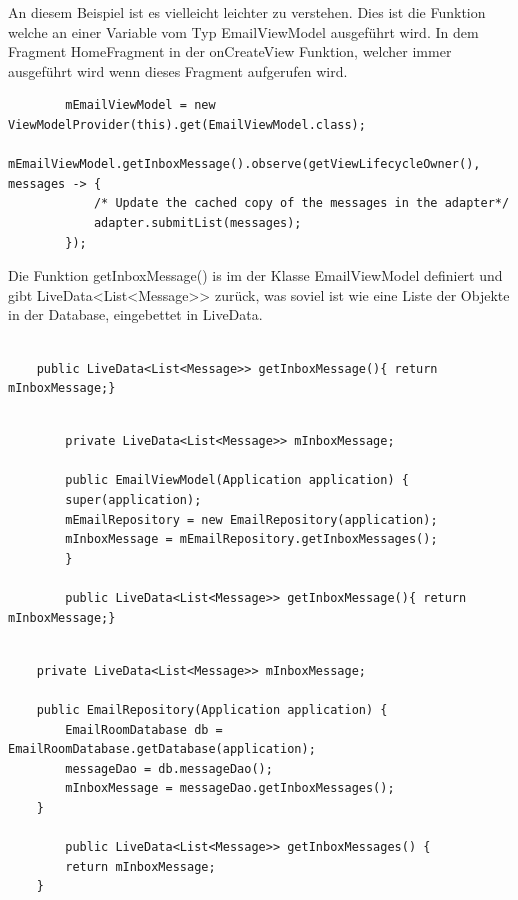 \documentclass[a4paper,11pt]{article}
\begin{document}
An diesem Beispiel ist es vielleicht leichter zu verstehen. Dies ist die Funktion welche an einer Variable vom Typ EmailViewModel ausgeführt wird. In dem Fragment HomeFragment in der
onCreateView Funktion, welcher immer ausgeführt wird wenn dieses Fragment aufgerufen wird. 


\lstset{language=java}
\begin{lstlisting}
        mEmailViewModel = new ViewModelProvider(this).get(EmailViewModel.class);
        mEmailViewModel.getInboxMessage().observe(getViewLifecycleOwner(), messages -> {
            /* Update the cached copy of the messages in the adapter*/
            adapter.submitList(messages);
        });
\end{lstlisting}

Die Funktion getInboxMessage() is im der Klasse EmailViewModel definiert und gibt LiveData<List<Message>> zurück, was soviel ist wie eine Liste der Objekte in der Database, eingebettet 
in LiveData.

\lstset{language=java}
\begin{lstlisting}

    public LiveData<List<Message>> getInboxMessage(){ return mInboxMessage;}

\end{lstlisting}

\lstset{language=java}
\begin{lstlisting}

        private LiveData<List<Message>> mInboxMessage;

        public EmailViewModel(Application application) {
        super(application);
        mEmailRepository = new EmailRepository(application);
        mInboxMessage = mEmailRepository.getInboxMessages();
        }

        public LiveData<List<Message>> getInboxMessage(){ return mInboxMessage;}

\end{lstlisting}


\lstset{language=java}
\begin{lstlisting}

    private LiveData<List<Message>> mInboxMessage;

    public EmailRepository(Application application) {
        EmailRoomDatabase db = EmailRoomDatabase.getDatabase(application);
        messageDao = db.messageDao();
        mInboxMessage = messageDao.getInboxMessages();
    }

        public LiveData<List<Message>> getInboxMessages() {
        return mInboxMessage;
    }


\end{lstlisting}
\end{document}
